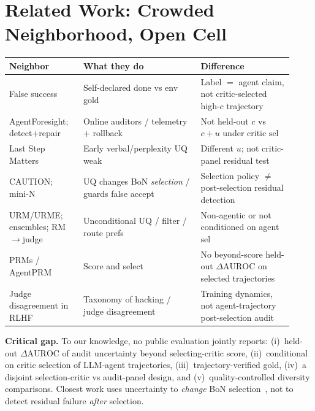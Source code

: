 \documentclass[11pt]{article}
\newcommand{\DeltaAUROC}{\Delta\mathrm{AUROC}}
\begin{document}
\section{Related Work: Crowded Neighborhood, Open Cell}

\begin{table}[h]
\centering\footnotesize
\begin{tabular}{@{}p{0.24\linewidth}p{0.38\linewidth}p{0.30\linewidth}@{}}
\toprule
\textbf{Neighbor} & \textbf{What they do} & \textbf{Difference} \\
\midrule
False success~\cite{falsesuccess}
& Self-declared done vs env gold
& Label $=$ agent claim, not critic-selected high-$c$ trajectory \\
AgentForesight; detect+repair~\cite{agentforesight,detectrepair}
& Online auditors / telemetry + rollback
& Not held-out $c$ vs $c{+}u$ under critic $\mathrm{sel}$ \\
Last Step Matters~\cite{laststep}
& Early verbal/perplexity UQ weak
& Different $u$; not critic-panel residual test \\
CAUTION; mini-N~\cite{caution,minin}
& UQ changes BoN \emph{selection} / guards false accept
& Selection policy $\neq$ post-selection residual detection \\
URM/URME; ensembles; RM$\to$judge~\cite{urm,coste,eisenstein,askjudge}
& Unconditional UQ / filter / route prefs
& Non-agentic or not conditioned on agent $\mathrm{sel}$ \\
PRMs / AgentPRM~\cite{lightman,agentprm,genver}
& Score and select
& No beyond-score held-out $\DeltaAUROC$ on selected trajectories \\
Judge disagreement in RLHF~\cite{rlhffails}
& Taxonomy of hacking / judge disagreement
& Training dynamics, not agent-trajectory post-selection audit \\
\bottomrule
\end{tabular}
\end{table}

\noindent\textbf{Critical gap.}
To our knowledge, no public evaluation jointly reports:
(i)~held-out $\DeltaAUROC$ of audit uncertainty beyond selecting-critic score,
(ii)~conditional on critic selection of LLM-agent trajectories,
(iii)~trajectory-verified gold,
(iv)~a disjoint selection-critic vs audit-panel design, and
(v)~quality-controlled diversity comparisons.
Closest work uses uncertainty to \emph{change} BoN selection~\cite{caution,urm,minin}, not to detect residual failure \emph{after} selection.
\end{document}
